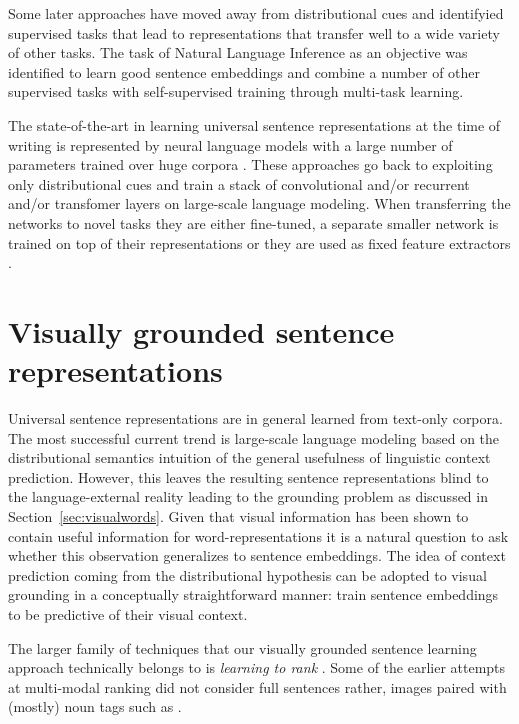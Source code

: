 Some later approaches have  moved away from distributional cues
and identifyied supervised tasks that lead to representations that transfer
well to a wide variety of other tasks. The task of Natural Language Inference \citep{bowman2015large,williams2017broad} as an objective
was identified to learn good sentence embeddings \citep{conneau-EtAl:2017:EMNLP2017,kiros2018inferlite}
and \cite{subramanian2018learning} combine a number of other supervised tasks
with self-supervised training through multi-task learning.


The state-of-the-art in learning universal sentence representations
at the time of writing is represented by neural language models
with a large number of parameters
trained over huge corpora \citep{peters2018deep,devlin2018bert}.
These approaches go back to
exploiting only distributional cues and train a stack of convolutional and/or recurrent
and/or transfomer layers on large-scale language modeling.
When transferring the networks to novel tasks they are either fine-tuned, a
separate smaller network is trained on top of their representations or they are used as
fixed feature extractors \citep{howard2018universal,peters2019tune}.

\section{Visually grounded sentence representations}
\label{sec:visualsentences}

Universal sentence representations are in general learned from text-only corpora. The most
successful current trend is large-scale language modeling based on
the distributional semantics intuition of the general usefulness of linguistic context prediction.
However, this leaves the resulting sentence representations blind to the language-external
reality leading to the grounding problem
as discussed in Section~\ref{sec:visualwords}. Given that visual information
has been shown to contain useful information for word-representations it
is a natural question to ask whether this observation generalizes to sentence
embeddings. The idea of context prediction coming from the distributional
hypothesis can be adopted to visual grounding in a conceptually straightforward manner:
train sentence embeddings to be predictive of their visual context.

The larger family of techniques that our visually grounded sentence learning
approach technically belongs to is \emph{learning to rank} \citep{li2011learning}.
Some of the earlier attempts at multi-modal ranking did not consider full sentences rather,
images paired with (mostly) noun tags such as \cite{weston2010large}.

